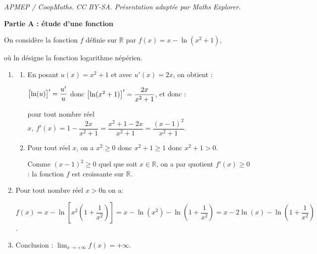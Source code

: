 \documentclass[10pt]{article}
\providecommand{\R}{\mathbb{R}}
\begin{document}
\noindent\textit{APMEP / CoopMaths. CC BY-SA. Présentation adaptée par Maths Explorer.}\par\medskip
\medskip

\begin{center}\textbf{Partie A : étude d'une fonction} \end{center}

On considère la fonction $f$ définie sur $\R$ par 
$f(x) = x - \ln \left(x^2 + 1\right),$

où ln désigne la fonction logarithme népérien.

\medskip

\begin{enumerate}
\item 
	\begin{enumerate}
		\item 
En posant $u(x) = x^2 + 1$ et avec $u'(x) = 2x$, on obtient :

$\left [\ln (u)\strut \right ]' = \dfrac{u'}{u}$ donc $\left [\ln (x^2+1)\strut \right ]' = \dfrac{2x}{x^2+ 1}$, et donc :

pour tout nombre réel $x, \: f'(x) = 1 - \dfrac{2x}{x^2+ 1} = \dfrac{x^2 + 1 - 2x}{x^2 + 1} =  \dfrac{(x - 1)^2}{ x^2 + 1}$.

		\item 
Pour tout réel $x$, on a $x^2 \geqslant 0$ donc $x^2 + 1\geqslant 1$ donc $x^2 + 1 > 0$.

Comme $(x - 1)^2 \geqslant 0$ quel que soit $x \in \R$, on a par quotient $f'(x) \geqslant 0$ : la fonction $f$ est croissante sur $\R$.
	\end{enumerate}
\item 

Pour tout nombre réel  $x > 0$n on a:

$f(x) =  x - \ln \left[x^2\left(1 + \dfrac{1}{x^2}\right)\right] = x - \ln (x^2) - \ln \left(1 + \dfrac{1}{x^2}\right) = x - 2 \ln(x) - \ln \left(1 + \dfrac{1}{x^2}\right)$. 

\item 
{}

Conclusion : $\displaystyle\lim_{x \to + \infty}f(x) = + \infty$.
\end{enumerate}
\end{document}
